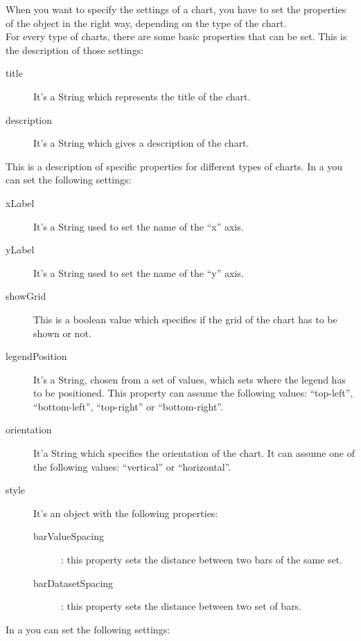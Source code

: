 			When you want to specify the settings of a chart, you have to set the properties of the  object in the right way, depending on the type of the chart.\\
			For every type of charts, there are some basic properties that can be set. This is the description of those settings:
			\begin{description}
				\item[title] It's a String which represents the title of the chart.
				\item[description] It's a String which gives a description of the chart.
			\end{description}
			This is a description of specific properties for different types of charts.
				In a  you can set the following settings:
				\begin{description}
					\item[xLabel] It's a String used to set the name of the “x” axis.
					\item[yLabel] It's a String used to set the name of the “y” axis.
					\item[showGrid] This is a boolean value which specifies if the grid of the chart has to be shown or not.
					\item[legendPosition] It's a String, chosen from a set of values, which sets where the legend has to be positioned. This property can assume the following values: “top-left”, “bottom-left”, “top-right” or “bottom-right”.
					\item[orientation] It'a String which specifies the orientation of the chart. It can assume one of the following values: “vertical” or “horizontal”.
					\item[style] It's an object with the following properties:
					\begin{description}
						\item[barValueSpacing]: this property sets the distance between two bars of the same set. 
						\item[barDatasetSpacing]: this property sets the distance between two set of bars.
					\end{description}
				\end{description}
				In a  you can set the following settings:
